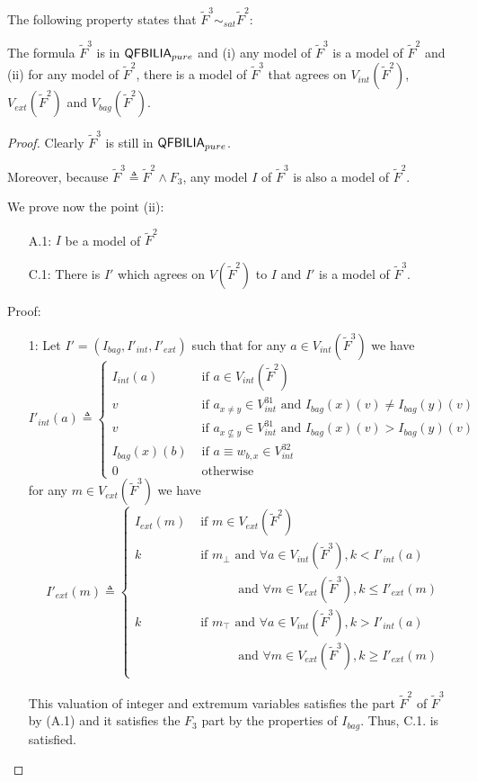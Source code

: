 The following property states that $\tilde{F}^3 \sim_{sat} \tilde{F}^2$:
\begin{myprop}
\label{prop:countabs}
The formula $\tilde{F}^3$ is in $\textsf{QFBILIA}_{pure}$ and
(i) any model of $\tilde{F}^3$ is a model of $\tilde{F}^2$ and
(ii) for any model of $\tilde{F}^2$, there is a model of $\tilde{F}^3$ that agrees on $V_{int}(\tilde{F}^2)$, $V_{ext}(\tilde{F}^2)$ and $V_{bag}(\tilde{F}^2)$.
\end{myprop}

\begin{proof}
Clearly $\tilde{F}^3$ is still in $\textsf{QFBILIA}_{pure}$.

Moreover, because $\tilde{F}^3 \triangleq \tilde{F}^2 \land F_{3}$, any model $I$ of $\tilde{F}^3$ is also a model of $\tilde{F}^2$.

We prove now the point (ii):
\begin{enumerate}
\item[A.1:] $I$ be a model of $\tilde{F}^2$
\item[C.1:] There is $I'$ which agrees on $V(\tilde{F}^2)$ to $I$ and $I'$ is a model of $\tilde{F}^3$.
\end{enumerate}
Proof:
\begin{enumerate}
\item[1:] Let $I'=(I_{bag}, I'_{int}, I'_{ext})$ such that for any $a\in V_{int}(\tilde{F}^3)$ we have
$$
I'_{int}(a) \triangleq \left\{
\begin{array}{ll}
I_{int}(a) & \mbox{ if } a \in V_{int}(\tilde{F}^2) \\
v & \mbox{ if } a_{x\neq y} \in V^{31}_{int} \mbox{ and } I_{bag}(x)(v) \neq I_{bag}(y)(v) \\
v & \mbox{ if } a_{x\nsubseteq y} \in V^{31}_{int} \mbox{ and } I_{bag}(x)(v) > I_{bag}(y)(v) \\
I_{bag}(x)(b) & \mbox{ if } a \equiv w_{b,x} \in V^{32}_{int} \\
0 & \mbox{ otherwise} %
\end{array}\right.
$$
for any $m\in V_{ext}(\tilde{F}^3)$ we have
$$
I'_{ext}(m) \triangleq \left\{
\begin{array}{ll}
I_{ext}(m) & \mbox{ if } m \in V_{ext}(\tilde{F}^2) \\
k & \mbox{ if } m_{\bot} \mbox{ and } \forall a \in V_{int}(\tilde{F}^3), k<I'_{int}(a) \\
& \quad\quad\quad \mbox{ and } \forall m \in V_{ext}(\tilde{F}^3), k\leq I'_{ext}(m)\\
k & \mbox{ if } m_{\top} \mbox{ and } \forall a \in V_{int}(\tilde{F}^3), k>I'_{int}(a) \\
& \quad\quad\quad \mbox{ and } \forall m \in V_{ext}(\tilde{F}^3), k\geq I'_{ext}(m)\\
\end{array}\right.
$$

This valuation of integer and extremum variables satisfies the part $\tilde{F}^2$ of $\tilde{F}^3$ by (A.1)
and it satisfies the $F_{3}$ part by the properties of $I_{bag}$.
Thus, C.1. is satisfied.
\end{enumerate}
\end{proof}

